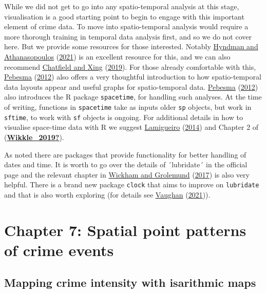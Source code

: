 \documentclass[
  krantz2]{krantz}
\begin{document}
While we did not get to go into any spatio-temporal analysis at this stage, visualisation is a good starting point to begin to engage with this important element of crime data. To move into spatio-temporal analysis would require a more thorough training in temporal data analysis first, and so we do not cover here. But we provide some resources for those interested. Notably \protect\hyperlink{ref-Hyndman_2021}{Hyndman and Athanasopoulos} (\protect\hyperlink{ref-Hyndman_2021}{2021}) is an excellent resource for this, and we can also recommend \protect\hyperlink{ref-Chatfield_2019}{Chatfield and Xing} (\protect\hyperlink{ref-Chatfield_2019}{2019}). For those already comfortable with this, \protect\hyperlink{ref-Pebesma_2012}{Pebesma} (\protect\hyperlink{ref-Pebesma_2012}{2012}) also offers a very thoughtful introduction to how spatio-temporal data layouts appear and useful graphs for spatio-temporal data. \protect\hyperlink{ref-Pebesma_2012}{Pebesma} (\protect\hyperlink{ref-Pebesma_2012}{2012}) also introduces the R package \texttt{spacetime}, for handling such analyses. At the time of writing, functions in \texttt{spacetime} take as inputs older \texttt{sp} objects, but work in \texttt{sftime}, to work with \texttt{sf} objects is ongoing. For additional details in how to visualise space-time data with R we suggest \protect\hyperlink{ref-Perpinan_2014}{Lamigueiro} (\protect\hyperlink{ref-Perpinan_2014}{2014}) and Chapter 2 of (\protect\hyperlink{ref-Wikkle_2019}{\textbf{Wikkle\_2019?}}).

As noted there are packages that provide functionality for better handling of dates and time. It is worth to go over the details of ´lubridate´ in the official page and the relevant chapter in \protect\hyperlink{ref-Wickham_2017}{Wickham and Grolemund} (\protect\hyperlink{ref-Wickham_2017}{2017}) is also very helpful. There is a brand new package \texttt{clock} that aims to improve on \texttt{lubridate} and that is also worth exploring (for details see \protect\hyperlink{ref-Vaughan_2021}{Vaughan} (\protect\hyperlink{ref-Vaughan_2021}{2021})).

\hypertarget{chapter-7-spatial-point-patterns-of-crime-events}{%
\chapter{Chapter 7: Spatial point patterns of crime events}\label{chapter-7-spatial-point-patterns-of-crime-events}}

\hypertarget{mapping-crime-intensity-with-isarithmic-maps}{%
\section{Mapping crime intensity with isarithmic maps}\label{mapping-crime-intensity-with-isarithmic-maps}}
\end{document}
